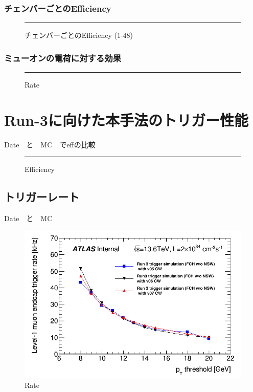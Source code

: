 \subsubsection{チェンバーごとのEfficiency}
\begin{figure}[tb]
  \centering
  \rule{8cm}{6cm}
  \caption{チェンバーごとのEfficiency (1-48)}
  \label{fig:fit_def}
\end{figure}

\subsubsection{ミューオンの電荷に対する効果}

\begin{figure}[tb]
  \centering
  \rule{8cm}{6cm}
  \caption{Rate}
  \label{fig:fit_def}
\end{figure}


\section{Run-3に向けた本手法のトリガー性能}
Date　と　MC　でeffの比較
\begin{figure}[tb]
  \centering
  \rule{8cm}{6cm}
  \caption{Efficiency}
  \label{fig:fit_def}
\end{figure}

\subsection{トリガーレート}
Date　と　MC
\begin{figure}[tb]
  \centering
  \includegraphics[clip, width=14cm]{fig/5/l1mue_rate_run3.png}
  \caption{Rate}
  \label{fig:fit_def}
\end{figure}


